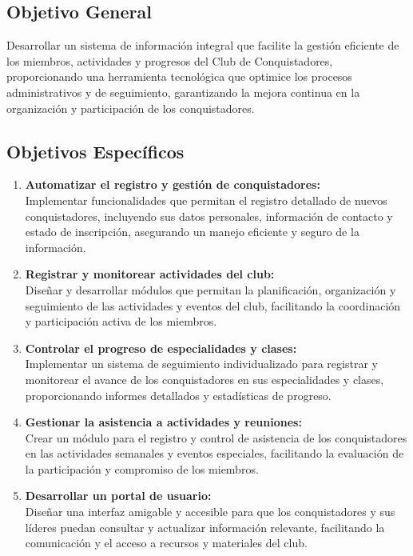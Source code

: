 \documentclass[stu, 12pt, letterpaper, donotrepeattitle, floatsintext, natbib]{apa7}
\begin{document}
    \subsection{Objetivo General}
    Desarrollar un sistema de informaci\'on integral que facilite la gesti\'on eficiente de los miembros, actividades y progresos del Club de Conquistadores, proporcionando una herramienta tecnol\'ogica que optimice los procesos administrativos y de seguimiento, garantizando la mejora continua en la organizaci\'on y participaci\'on de los conquistadores.

    \subsection{Objetivos Espec\'ificos}
    \begin{enumerate}
        \item\textbf{Automatizar el registro y gesti\'on de conquistadores:}\\Implementar funcionalidades que permitan el registro detallado de nuevos conquistadores, incluyendo sus datos personales, informaci\'on de contacto y estado de inscripci\'on, asegurando un manejo eficiente y seguro de la informaci\'on.
        \item\textbf{Registrar y monitorear actividades del club:}\\Diseñar y desarrollar m\'odulos que permitan la planificaci\'on, organizaci\'on y seguimiento de las actividades y eventos del club, facilitando la coordinaci\'on y participaci\'on activa de los miembros.
        \item\textbf{Controlar el progreso de especialidades y clases:}\\Implementar un sistema de seguimiento individualizado para registrar y monitorear el avance de los conquistadores en sus especialidades y clases, proporcionando informes detallados y estad\'isticas de progreso.
        \item\textbf{Gestionar la asistencia a actividades y reuniones:}\\Crear un m\'odulo para el registro y control de asistencia de los conquistadores en las actividades semanales y eventos especiales, facilitando la evaluaci\'on de la participaci\'on y compromiso de los miembros.
        \item\textbf{Desarrollar un portal de usuario:}\\Dise\~{n}ar una interfaz amigable y accesible para que los conquistadores y sus l\'ideres puedan consultar y actualizar informaci\'on relevante, facilitando la comunicaci\'on y el acceso a recursos y materiales del club.

\end{enumerate}
\end{document}
